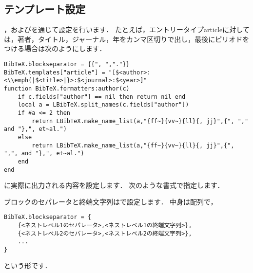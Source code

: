 \documentclass[a4paper]{ltjsarticle}
\begin{document}
\subsection{テンプレート設定}\label{subsec:テンプレート設定}
，およびを通じて設定を行います．
たとえば，エントリータイプarticleに対しては，著者，タイトル，ジャーナル，年をカンマ区切りで出し，最後にピリオドをつける場合は次のようにします．
\begin{lstlisting}
BibTeX.blockseparator = {{", ","."}}
BibTeX.templates["article"] = "[$<author>:<\\emph{|$<title>|}>:$<journal>:$<year>]"
function BibTeX.formatters:author(c)
	if c.fields["author"] == nil then return nil end
	local a = LBibTeX.split_names(c.fields["author"])
	if #a <= 2 then
		return LBibTeX.make_name_list(a,"{ff~}{vv~}{ll}{, jj}",{", "," and "},", et~al.")
	else
		return LBibTeX.make_name_list(a,"{ff~}{vv~}{ll}{, jj}",{", ",", and "},", et~al.")
	end
end
\end{lstlisting}
に実際に出力される内容を設定します．
次のような書式で指定します．

ブロックのセパレータと終端文字列はで設定します．
中身は配列で，
\begin{lstlisting}
BibTeX.blockseparator = {
    {<ネストレベル1のセパレータ>,<ネストレベル1の終端文字列>},
    {<ネストレベル2のセパレータ>,<ネストレベル2の終端文字列>},
    ...
}
\end{lstlisting}
という形です．
\end{document}

